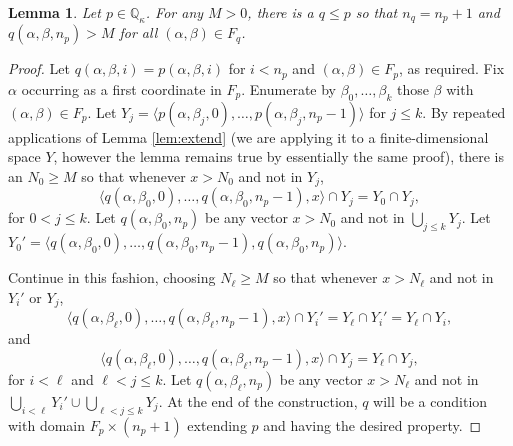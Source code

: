\documentclass[11pt]{amsart}
\newcommand{\Q}{\mathbb{Q}}
\newtheorem{lemma}[thm]{Lemma}
\theoremstyle{definition}
\theoremstyle{remark}
\renewcommand{\1}{\mathbf{1}}
\begin{document}
\begin{lemma}\label{lem:extend_n_p}
	Let $p\in\Q_\kappa$. For any $M>0$, there is a $q\leq p$ so that $n_q=n_p+1$ and $q(\alpha,\beta,n_p)>M$ for all $(\alpha,\beta)\in F_q$.
\end{lemma}

\begin{proof}
	Let $q(\alpha,\beta,i)=p(\alpha,\beta,i)$ for $i<n_p$ and $(\alpha,\beta)\in F_p$, as required.	Fix $\alpha$ occurring as a first coordinate in $F_p$. Enumerate by $\beta_0,\ldots,\beta_k$ those $\beta$ with $(\alpha,\beta)\in F_p$. Let $Y_j=\langle p(\alpha,\beta_j,0),\ldots,p(\alpha,\beta_j,n_p-1)\rangle$ for $j\leq k$. By repeated applications of Lemma \ref{lem:extend} (we are applying it to a finite-dimensional space $Y$, however the lemma remains true by essentially the same proof), there is an $N_0\geq M$ so that whenever $x>N_0$ and not in $Y_j$,
	\[
		\langle q(\alpha,\beta_0,0),\ldots,q(\alpha,\beta_0,n_p-1),x\rangle\cap Y_j=Y_0\cap Y_j,
	\]
	for $0<j\leq k$. Let $q(\alpha,\beta_0,n_p)$ be any vector $x>N_0$ and not in $\bigcup_{j\leq k}Y_j$. Let $Y_0'=\langle q(\alpha,\beta_0,0),\ldots,q(\alpha,\beta_0,n_p-1),q(\alpha,\beta_0,n_p)\rangle$.
%	
	
	Continue in this fashion, choosing $N_\ell\geq M$ so that whenever $x>N_\ell$ and not in $Y_i'$ or $Y_j$,
	\[
		\langle q(\alpha,\beta_\ell,0),\ldots,q(\alpha,\beta_\ell,n_p-1),x\rangle\cap Y_i'=Y_\ell\cap Y_i'=Y_\ell\cap Y_i,
	\]
	and
	\[
		\langle q(\alpha,\beta_\ell,0),\ldots,q(\alpha,\beta_\ell,n_p-1),x\rangle\cap Y_j=Y_\ell\cap Y_j,
	\]
	for $i<\ell$ and $\ell<j\leq k$. Let $q(\alpha,\beta_\ell,n_p)$ be any vector $x>N_\ell$ and not in $\bigcup_{i<\ell} Y_i'\cup\bigcup_{\ell<j\leq k}Y_j$. At the end of the construction, $q$ will be a condition with domain $F_p\times(n_p+1)$ extending $p$ and having the desired property.
\end{proof}
\end{document}

